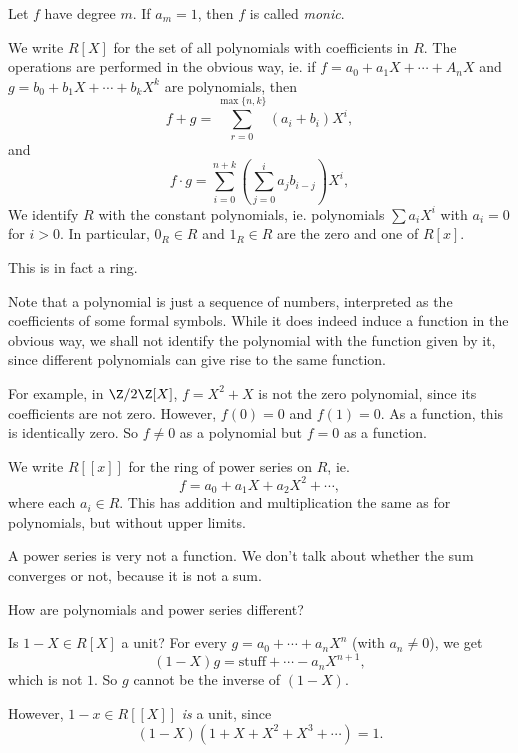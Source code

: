 \documentclass[a4paper]{article}
\begin{document}
\begin{defi}
  Let $f$ have degree $m$. If $a_m = 1$, then $f$ is called \emph{monic}.
\end{defi}

\begin{defi}
  We write $R[X]$ for the set of all polynomials with coefficients in $R$. The operations are performed in the obvious way, ie. if $f = a_0 + a_1X + \cdots + A_n X$ and $g = b_0 + b_1X + \cdots + b_k X^k$ are polynomials, then
  \[
    f + g = \sum_{r = 0}^{\max\{n, k\}} (a_i + b_i) X^i,
  \]
  and
  \[
    f\cdot g = \sum_{i = 0}^{n + k} \left(\sum_{j = 0}^i a_j b_{i - j}\right) X^i,
  \]
  We identify $R$ with the constant polynomials, ie. polynomials $\sum a_i X^i$ with $a_i = 0$ for $i > 0$. In particular, $0_R \in R$ and $1_R \in R$ are the zero and one of $R[x]$.
\end{defi}
This is in fact a ring.

Note that a polynomial is just a sequence of numbers, interpreted as the coefficients of some formal symbols. While it does indeed induce a function in the obvious way, we shall not identify the polynomial with the function given by it, since different polynomials can give rise to the same function.

For example, in $\Z/2\Z [X]$, $f = X^2 + X$ is not the zero polynomial, since its coefficients are not zero. However, $f(0) = 0$ and $f(1) = 0$. As a function, this is identically zero. So $f \not= 0$ as a polynomial but $f = 0$ as a function.

\begin{defi}
  We write $R[[x]]$ for the ring of power series on $R$, ie.
  \[
    f = a_0 + a_1 X + a_2 X^2 + \cdots,
  \]
  where each $a_i \in R$. This has addition and multiplication the same as for polynomials, but without upper limits.
\end{defi}
A power series is very not a function. We don't talk about whether the sum converges or not, because it is not a sum.

How are polynomials and power series different?

\begin{eg}
  Is $1 - X \in R[X]$ a unit? For every $g = a_0 + \cdots + a_n X^n$ (with $a_n \not= 0$), we get
  \[
    (1 - X)g = \text{stuff} + \cdots - a_n X^{n + 1},
  \]
  which is not $1$. So $g$ cannot be the inverse of $(1 - X)$.

  However, $1 - x \in R[[X]]$ \emph{is} a unit, since
  \[
    (1 - X)(1 + X + X^2 + X^3 + \cdots) = 1.
  \]
\end{eg}
\end{document}

